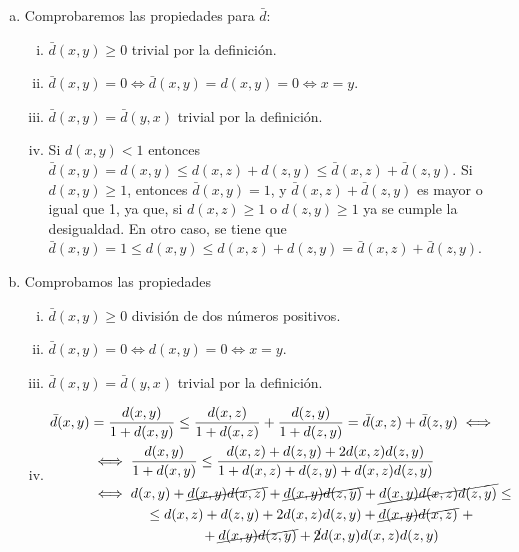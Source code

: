 \begin{eje}
    \begin{enumerate}[(a)]
        \item Comprobaremos las propiedades para $\bar{d}$:
            \begin{enumerate}[i)]
                \item $\bar{d}(x,y) \geq 0$ trivial por la definición.
                \item $\bar{d}(x,y) = 0 \iff \bar{d}(x,y) = d(x,y) = 0 \iff x = y$.
                \item $\bar{d}(x,y) = \bar{d}(y,x)$ trivial por la definición.
                \item Si $d(x,y) < 1$ entonces $\bar{d}(x,y) = d(x,y) \leq d(x,z) + d(z,y) \leq \bar{d}(x,z) + \bar{d}(z,y)$. Si $d(x,y) \geq 1$,
                    entonces $\bar{d}(x,y) = 1$, y $\bar{d}(x,z) + \bar{d}(z,y)$ es mayor o igual que 1, ya que, si $d(x,z) \geq 1$ o
                    $d(z,y) \geq 1$ ya se cumple la desigualdad. En otro caso, se tiene que $\bar{d}(x,y) = 1 \leq d(x,y) \leq d(x,z) + d(z,y) =
                    \bar{d}(x,z) + \bar{d}(z,y)$.
            \end{enumerate}
        \item Comprobamos las propiedades
            \begin{enumerate}[i)]
                \item $\bar{d}(x,y) \geq 0$ división de dos números positivos.
                \item $\bar{d}(x,y) = 0 \iff d(x,y) = 0 \iff x = y$.
                \item $\bar{d}(x,y) = \bar{d}(y,x)$ trivial por la definición.
                \item 
                    \begin{align*}
                        \bar{d}(x,y) &= \frac{d(x,y)}{1 + d(x,y)} \leq \frac{d(x,z)}{1 + d(x,z)} + \frac{d(z,y)}{1 + d(z,y)} =
                        \bar{d}(x,z) + \bar{d}(z,y) \iff \\
                        &\iff \frac{d(x,y)}{1+d(x,y)} \leq \frac{d(x,z) + d(z,y) + 2d(x,z)d(z,y)}{1 + d(x,z) + d(z,y) + d(x,z)d(z,y)} \\
                        &\iff d(x,y) + \cancel{d(x,y)d(x,z)} + \cancel{d(x,y)d(z,y)} + \cancel{d(x,y)d(x,z)d(z,y)} \leq \\
                        &\qquad\qquad\leq d(x,z) + d(z,y) + 2d(x,z)d(z,y) + \cancel{d(x,y)d(x,z)} \,\,+ \\
                            &\qquad\qquad\qquad\qquad +\cancel{d(x,y)d(z,y)} + \cancel{2}d(x,y)d(x,z)d(z,y) \\

\end{align*}
\end{enumerate}
\end{enumerate}
\end{eje}
